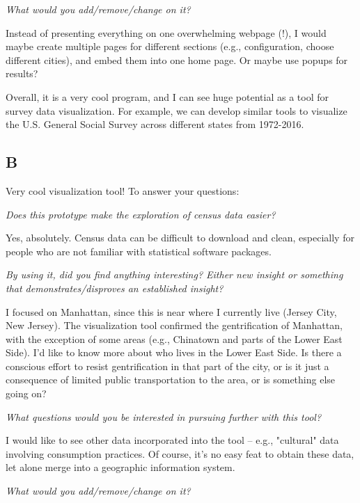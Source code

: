 \documentclass[a4paper]{article}
\newcommand{\question}[1]{\smallskip\noindent\emph{#1}}
\newcommand{\censure}[1]{}
\begin{document}
 
\question{What would you add/remove/change on it?}
 

Instead of presenting everything on one overwhelming webpage (!), I would maybe
create multiple pages for different sections (e.g., configuration, choose
different cities), and embed them into one home page. Or maybe use popups for
results?
 
 
Overall, it is a very cool program, and I can see huge potential as a tool for
survey data visualization. For example, we can develop similar tools to
visualize the U.S. General Social Survey across different states from 1972-2016.


\subsection{B\censure{ - Ethan Fosse}}
\censure{\emph{Research Associate at Princeton University, USA}}

Very cool visualization tool! To answer your questions:

\question{Does this prototype make the exploration of census data easier?}

Yes, absolutely. Census data can be difficult to download and clean, especially
for people who are not familiar with statistical software packages.

\question{By using it, did you find anything interesting? Either new insight or
something that demonstrates/disproves an established insight?}

I focused on Manhattan, since this is near where I currently live (Jersey City,
New Jersey). The visualization tool confirmed the gentrification of Manhattan,
with the exception of some areas (e.g., Chinatown and parts of the Lower East
Side). I'd like to know more about who lives in the Lower East Side. Is there a
conscious effort to resist gentrification in that part of the city, or is it
just a consequence of limited public transportation to the area, or is something
else going on?
 
\question{What questions would you be interested in pursuing further with this tool? }

I would like to see other data incorporated into the tool -- e.g., "cultural"
data involving consumption practices. Of course, it's no easy feat to obtain
these data, let alone merge into a geographic information system.

\question{What would you add/remove/change on it?}
\end{document}
